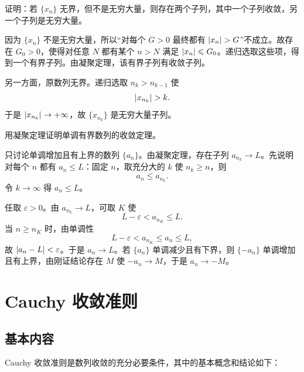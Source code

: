 \begin{xexercise}[3]
证明：若 $\{x_n\}$ 无界，但不是无穷大量，则存在两个子列，其中一个子列收敛，另一个子列是无穷大量。
\end{xexercise}
\begin{xsolution}
因为 $\{x_n\}$ 不是无穷大量，所以“对每个 $G>0$ 最终都有 $\lvert x_n\rvert>G$”不成立。故存在 $G_0>0$，使得对任意 $N$ 都有某个 $n>N$ 满足 $\lvert x_n\rvert\leqslant G_0$。递归选取这些项，得到一个有界子列。由凝聚定理，该有界子列有收敛子列。

另一方面，原数列无界。递归选取 $n_k>n_{k-1}$ 使
\[
  \lvert x_{n_k}\rvert>k.
\]
于是 $\lvert x_{n_k}\rvert\to+\infty$，故 $\{x_{n_k}\}$ 是无穷大量子列。
\end{xsolution}


\begin{xexercise}[4]
用凝聚定理证明单调有界数列的收敛定理。
\end{xexercise}
\begin{xsolution}
只讨论单调增加且有上界的数列 $\{a_n\}$。由凝聚定理，存在子列 $a_{n_k}\to L$。先说明对每个 $n$ 都有 $a_n\leqslant L$：固定 $n$，取充分大的 $k$ 使 $n_k\geqslant n$，则
\[
  a_n\leqslant a_{n_k}.
\]
令 $k\to\infty$ 得 $a_n\leqslant L$。

任取 $\varepsilon>0$。由 $a_{n_k}\to L$，可取 $K$ 使
\[
  L-\varepsilon<a_{n_K}\leqslant L.
\]
当 $n\geqslant n_K$ 时，由单调性
\[
  L-\varepsilon<a_{n_K}\leqslant a_n\leqslant L,
\]
故 $\lvert a_n-L\rvert<\varepsilon$。于是 $a_n\to L$。若 $\{a_n\}$ 单调减少且有下界，则 $\{-a_n\}$ 单调增加且有上界，由刚证结论存在 $M$ 使 $-a_n\to M$，于是 $a_n\to-M$。
\end{xsolution}


\section{Cauchy 收敛准则}

\subsection{基本内容}

Cauchy 收敛准则是数列收敛的充分必要条件，其中的基本概念和结论如下：

